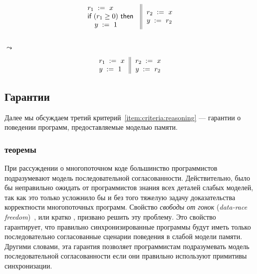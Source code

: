 {\footnotesize
\begin{minipage}{0.45\linewidth}
\begin{equation*}
\inarrII{
   \readInst{}{r_1}{x}             \\
   \kw{if} (r_1 \geq 0) ~\kw{then} \\
   \quad\writeInst{}{y}{1}         \\
}{
  \readInst{}{r_2}{x}               \\
  \writeInst{}{y}{r_2}              \\
}
\end{equation*}
\end{minipage}\hfill%
\begin{minipage}{0.05\linewidth}
\Large~\\ $\leadsto$
\end{minipage}\hfill%
\begin{minipage}{0.4\linewidth}
\begin{equation*}
\inarrII{
   \readInst{}{r_1}{x}             \\
   \writeInst{}{y}{1}              \\
}{
  \readInst{}{r_2}{x}               \\
  \writeInst{}{y}{r_2}              \\
}
\end{equation*}
\end{minipage}
}

\subsection{Гарантии}

Далее мы обсуждаем третий критерий~\ref{item:criteria:reasoning} ---
гарантии о поведении программ, предоставляемые моделью памяти.

\subsubsection{\DRF теоремы}
\label{sec:background:drf}

При рассуждении о многопоточном коде 
большинство программистов подразумевают 
модель последовательной согласованности. 
Действительно, было бы неправильно ожидать
от программистов знания всех деталей слабых моделей, 
так как это только усложнило бы и без того 
тяжелую задачу доказательства корректности 
многопоточных программ. 
Свойство \emph{свободы от гонок}
(\emph{data-race freedom})~\cite{Manson-al:POPL05}, 
или кратко \DRF, призвано решить эту проблему. 
Это свойство гарантирует, что правильно 
синхронизированные программы будут иметь 
только последовательно согласованные 
сценарии поведения в слабой модели памяти. 
Другими словами, эта гарантия позволяет программистам 
подразумевать модель последовательной согласованности
если они правильно используют примитивы синхронизации. 

